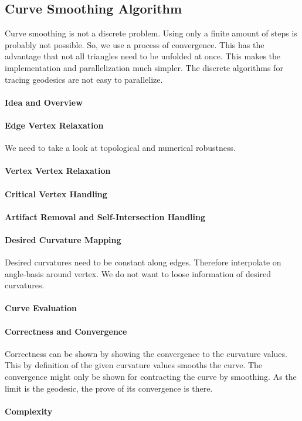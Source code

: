 \documentclass{stdlocal}
\begin{document}

\subsection{Curve Smoothing Algorithm} %
\label{sub:curve_smoothing_algorithm}
  Curve smoothing is not a discrete problem.
  Using only a finite amount of steps is probably not possible.
  So, we use a process of convergence.
  This has the advantage that not all triangles need to be unfolded at once.
  This makes the implementation and parallelization much simpler.
  The discrete algorithms for tracing geodesics are not easy to parallelize.

  \paragraph{Idea and Overview}
  \paragraph{Edge Vertex Relaxation}
    We need to take a look at topological and numerical robustness.
  \paragraph{Vertex Vertex Relaxation}
  \paragraph{Critical Vertex Handling}
  \paragraph{Artifact Removal and Self-Intersection Handling}
  \paragraph{Desired Curvature Mapping}
    Desired curvatures need to be constant along edges.
    Therefore interpolate on angle-basis around vertex.
    We do not want to loose information of desired curvatures.
  \paragraph{Curve Evaluation}
  \paragraph{Correctness and Convergence}
    Correctness can be shown by showing the convergence to the curvature values.
    This by definition of the given curvature values smooths the curve.
    The convergence might only be shown for contracting the curve by smoothing.
    As the limit is the geodesic, the prove of its convergence is there.
  \paragraph{Complexity}

\end{document}
